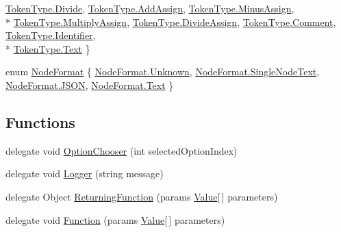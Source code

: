 \begin{DoxyCompactItemize}
\hyperlink{a00029_a301aa7c866593a5b625a8fc158bbeacea0b914e196182d02615487e9793ecff3d}{Token\-Type.\-Divide}, 
\hyperlink{a00029_a301aa7c866593a5b625a8fc158bbeaceab055bb9ca4c2fabe4be4aa6e9e3278c6}{Token\-Type.\-Add\-Assign}, 
\hyperlink{a00029_a301aa7c866593a5b625a8fc158bbeaceab05d460746c046306a3b74039a9977ba}{Token\-Type.\-Minus\-Assign}, 
\\*
\hyperlink{a00029_a301aa7c866593a5b625a8fc158bbeacea7c3dfbd9bd6620d1cde7bbad4750a9c4}{Token\-Type.\-Multiply\-Assign}, 
\hyperlink{a00029_a301aa7c866593a5b625a8fc158bbeacea60776f3f45a828ebfd062b8ad8118b38}{Token\-Type.\-Divide\-Assign}, 
\hyperlink{a00029_a301aa7c866593a5b625a8fc158bbeacea0be8406951cdfda82f00f79328cf4efc}{Token\-Type.\-Comment}, 
\hyperlink{a00029_a301aa7c866593a5b625a8fc158bbeacea29ee5d1ebcc033234938a5234f1f2075}{Token\-Type.\-Identifier}, 
\\*
\hyperlink{a00029_a301aa7c866593a5b625a8fc158bbeacea9dffbf69ffba8bc38bc4e01abf4b1675}{Token\-Type.\-Text}
 \}
\item 
enum \hyperlink{a00029_ad7ebb46e7309ead8767383a672b3272f}{Node\-Format} \{ \hyperlink{a00029_ad7ebb46e7309ead8767383a672b3272fa88183b946cc5f0e8c96b2e66e1c74a7e}{Node\-Format.\-Unknown}, 
\hyperlink{a00029_ad7ebb46e7309ead8767383a672b3272faceeb33da53902872b63956f8df786cd8}{Node\-Format.\-Single\-Node\-Text}, 
\hyperlink{a00029_ad7ebb46e7309ead8767383a672b3272fa0ecd11c1d7a287401d148a23bbd7a2f8}{Node\-Format.\-J\-S\-O\-N}, 
\hyperlink{a00029_ad7ebb46e7309ead8767383a672b3272fa9dffbf69ffba8bc38bc4e01abf4b1675}{Node\-Format.\-Text}
 \}
\end{DoxyCompactItemize}
\subsection*{Functions}
\begin{DoxyCompactItemize}
\item 
delegate void \hyperlink{a00029_a39866cbb03c03a35805d598b5d4ad553}{Option\-Chooser} (int selected\-Option\-Index)
\item 
delegate void \hyperlink{a00029_a1e50031b945a3a2afafee6f590730568}{Logger} (string message)
\item 
delegate Object \hyperlink{a00029_a5177bf74fbfe7303fac9d8236c2e514b}{Returning\-Function} (params \hyperlink{a00161}{Value}\mbox{[}$\,$\mbox{]} parameters)
\item 
delegate void \hyperlink{a00029_ae0be2e5cf13d5779816102439e61ff1a}{Function} (params \hyperlink{a00161}{Value}\mbox{[}$\,$\mbox{]} parameters)
\end{DoxyCompactItemize}


